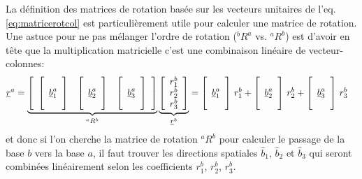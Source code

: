 La définition des matrices de rotation basée sur les vecteurs unitaires de l'eq. \eqref{eq:matricerotcol} est particulièrement utile pour calculer une matrice de rotation. Une astuce pour ne pas mélanger l'ordre de rotation ($^bR^a$ vs. $^aR^b$) est d'avoir en tête que la multiplication matricielle c'est une combinaison linéaire de vecteur-colonnes:
\begin{align}
	\underline{r}^a &=
	\underbrace{ \left[ \begin{array}{c c c}
							\left[ \begin{array}{c} \\ \underline{b}_1^a \\  \\ \end{array}  \right] & \left[ \begin{array}{c} \\ \underline{b}_2^a \\  \\ \end{array}  \right] & \left[ \begin{array}{c} \\ \underline{b}_3^a \\  \\ \end{array}  \right]
	\end{array} \right] }_{^aR^b}
	\underbrace{ \left[ \begin{array}{c} r_1^b \\ r_2^b \\ r_3^b  \end{array} \right] }_{\underline{r}^b}
	=
	\left[ \begin{array}{c} \\ \underline{b}_1^a \\  \\ \end{array}  \right] \, r_1^b + \left[ \begin{array}{c} \\ \underline{b}_2^a \\  \\ \end{array}  \right]\, r_2^b + \left[ \begin{array}{c} \\ \underline{b}_3^a \\  \\ \end{array}  \right] \, r_3^b
\end{align}
et donc si l'on cherche la matrice de rotation ${}^aR^b$ pour calculer le passage de la base $b$ vers la base $a$, il faut trouver les directions spatiales $\hat{b}_1$, $\hat{b}_2$ et $\hat{b}_3$ qui seront combinées linéairement selon les coefficients $r_1^b$, $r_2^b$, $r_3^b$.

